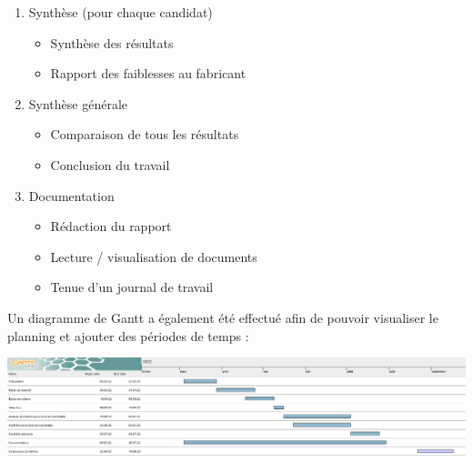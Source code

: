 \begin{enumerate}
\begin{itemize}
		\end{itemize}
	\item Synthèse (pour chaque candidat)
		\begin{itemize}
			\item Synthèse des résultats
			\item Rapport des faiblesses au fabricant
		\end{itemize}
	\item Synthèse générale
		\begin{itemize}
			\item Comparaison de tous les résultats
			\item Conclusion du travail
		\end{itemize}
	\item Documentation
		\begin{itemize}
			\item Rédaction du rapport
			\item Lecture / visualisation de documents
			\item Tenue d'un journal de travail
		\end{itemize}
\end{enumerate}

Un diagramme de Gantt a également été effectué afin de pouvoir visualiser le planning et ajouter des périodes de temps :
\begin{center}
\includegraphics[width=15.5cm]{images/planning.png}
\end{center}
